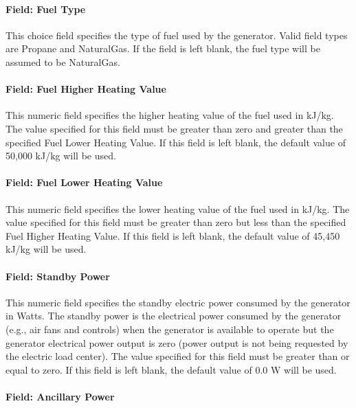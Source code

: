 \paragraph{Field: Fuel Type}\label{field-fuel-type-2}

This choice field specifies the type of fuel used by the generator. Valid field types are Propane and NaturalGas. If the field is left blank, the fuel type will be assumed to be NaturalGas.

\paragraph{Field: Fuel Higher Heating Value}\label{field-fuel-higher-heating-value-2}

This numeric field specifies the higher heating value of the fuel used in kJ/kg. The value specified for this field must be greater than zero and greater than the specified Fuel Lower Heating Value. If this field is left blank, the default value of 50,000 kJ/kg will be used.

\paragraph{Field: Fuel Lower Heating Value}\label{field-fuel-lower-heating-value}

This numeric field specifies the lower heating value of the fuel used in kJ/kg. The value specified for this field must be greater than zero but less than the specified Fuel Higher Heating Value. If this field is left blank, the default value of 45,450 kJ/kg will be used.

\paragraph{Field: Standby Power}\label{field-standby-power}

This numeric field specifies the standby electric power consumed by the generator in Watts. The standby power is the electrical power consumed by the generator (e.g., air fans and controls) when the generator is available to operate but the generator electrical power output is zero (power output is not being requested by the electric load center). The value specified for this field must be greater than or equal to zero. If this field is left blank, the default value of 0.0 W will be used.

\paragraph{Field: Ancillary Power}\label{field-ancillary-power}

